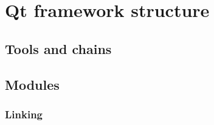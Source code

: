 \section{Qt framework structure}\label{section:qtstructure}

\subsection{Tools and chains}

\subsection{Modules}

\subsubsection{Linking}
